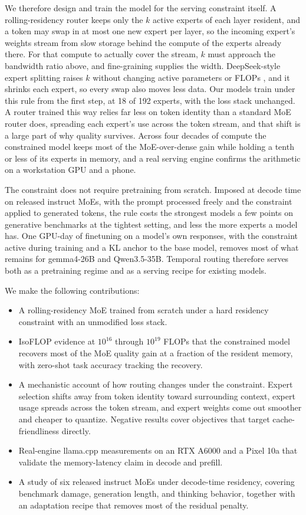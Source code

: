 \documentclass{article}
\begin{document}
We therefore design and train the model for the serving constraint itself. A
rolling-residency router keeps only the $k$ active experts of each layer resident, and a
token may swap in at most one new expert per layer, so the incoming expert's weights stream
from slow storage behind the compute of the experts already there. For that compute to
actually cover the stream, $k$ must approach the bandwidth ratio above, and fine-graining
supplies the width. DeepSeek-style expert splitting raises $k$ without changing active
parameters or FLOPs \citep{dai2024deepseekmoe,krajewski2024granularity}, and it shrinks each
expert, so every swap also moves less data. Our models train under this rule from the first
step, at 18 of 192 experts, with the loss stack unchanged. A router trained this way relies
far less on token identity than a standard MoE router does, spreading each expert's use
across the token stream, and that shift is a large part of why quality survives. Across four decades of compute the constrained model keeps most of the
MoE-over-dense gain while holding a tenth or less of its experts in memory, and a real
serving engine confirms the arithmetic on a workstation GPU and a phone.

The constraint does not require pretraining from scratch. Imposed at decode time on released
instruct MoEs, with the prompt processed freely and the constraint applied to generated
tokens, the rule costs the strongest models a few points on generative benchmarks at the
tightest setting, and less the more experts a model has. One GPU-day of finetuning on a
model's own responses, with the constraint active during training and a KL anchor to the base
model, removes most of what remains for gemma4-26B and Qwen3.5-35B. Temporal routing
therefore serves both as a pretraining regime and as a serving recipe for existing models.

We make the following contributions:
\begin{itemize}
\item A rolling-residency MoE trained from scratch under a hard residency constraint with an
  unmodified loss stack.
\item IsoFLOP evidence at $10^{16}$ through $10^{19}$ FLOPs that the constrained model
  recovers most of the MoE quality gain at a fraction of the resident memory, with zero-shot
  task accuracy tracking the recovery.
\item A mechanistic account of how routing changes under the constraint. Expert selection
  shifts away from token identity toward surrounding context, expert usage spreads across the
  token stream, and expert weights come out smoother and cheaper to quantize. Negative
  results cover objectives that target cache-friendliness directly.
\item Real-engine llama.cpp measurements on an RTX A6000 and a Pixel 10a that validate the
  memory-latency claim in decode and prefill.
\item A study of six released instruct MoEs under decode-time residency, covering benchmark
  damage, generation length, and thinking behavior, together with an adaptation recipe that
  removes most of the residual penalty.
\end{itemize}
\end{document}
